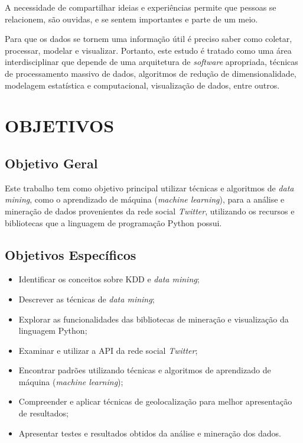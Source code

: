 A necessidade de compartilhar ideias e experiências permite que pessoas se relacionem, são ouvidas, e se sentem importantes e parte de um meio. 


Para que os dados se tornem uma informação útil é preciso saber como coletar, processar, modelar e visualizar. Portanto, este estudo é tratado como uma área interdisciplinar que depende de uma arquitetura de \textit{software} apropriada, técnicas de processamento massivo de dados, algoritmos de redução de dimensionalidade, modelagem estatística e computacional, visualização de dados, entre outros.


\section{OBJETIVOS}\label{sec:objetivos}

\subsection{Objetivo Geral} 
Este trabalho tem como objetivo principal utilizar técnicas e algoritmos de \textit{data mining}, como o aprendizado de máquina (\textit{machine learning}), para a análise e mineração de dados provenientes da rede social \textit{Twitter}, utilizando os recursos e bibliotecas que a linguagem de programação Python possui.

\subsection{Objetivos Específicos}\label{subsec:objetivos_especificos}
\begin{itemize}
	\item Identificar os conceitos sobre KDD e \textit{data mining};
	\item Descrever as técnicas de \textit{data mining};
	\item Explorar as funcionalidades das bibliotecas de mineração e visualização da linguagem Python;
	\item Examinar e utilizar a API da rede social \textit{Twitter};
	\item Encontrar padrões utilizando técnicas e algoritmos de aprendizado de máquina (\textit{machine learning});
	\item Compreender e aplicar técnicas de geolocalização para melhor apresentação de resultados;
	\item Apresentar testes e resultados obtidos da análise e mineração dos dados.
\end{itemize}


